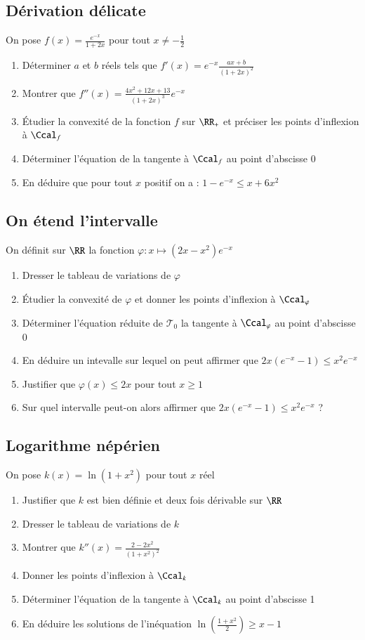 \documentclass[oneside,12pt]{article}          %
\begin{document}
\subsection{Dérivation délicate}
On pose $f(x)=\frac{e^{-x}}{1+2x}$ pour tout $x\neq-\frac{1}{2}$
\begin{enumerate}
    \item Déterminer $a$ et $b$ réels tels que $f'(x)=e^{-x}\frac{ax+b}{(1+2x)^2}$
    \item Montrer que $f''(x)=\frac{4x^2+12x+13}{(1+2x)^3}e^{-x}$
    \item Étudier la convexité de la fonction $f$ sur $\RR_+$ et préciser les points d'inflexion à $\Ccal_f$
    \item Déterminer l'équation de la tangente à $\Ccal_f$ au point d'abscisse 0
    \item En déduire que pour tout $x$ positif on a : $1-e^{-x}\leq x+6x^2$
\end{enumerate}



\subsection{On étend l'intervalle}
On définit sur $\RR$ la fonction $\varphi:x\mapsto(2x-x^2)e^{-x}$
\begin{enumerate}
	\item Dresser le tableau de variations de $\varphi$
	\item Étudier la convexité de $\varphi$ et donner les points d'inflexion à $\Ccal_\varphi$
	\item Déterminer l'équation réduite de $\mathcal{T}_0$ la tangente à $\Ccal_\varphi$ au point d'abscisse 0
	\item En déduire un intevalle sur lequel on peut affirmer que $2x(e^{-x}-1)\leq x^2e^{-x}$
	\item Justifier que $\varphi(x)\leq2x$ pour tout $x\geq1$
	\item Sur quel intervalle peut-on alors affirmer que $2x(e^{-x}-1)\leq x^2e^{-x}$ ?
\end{enumerate}



\subsection{Logarithme népérien}
On pose $k(x)=\ln(1+x^2)$ pour tout $x$ réel
\begin{enumerate}
    \item Justifier que $k$ est bien définie et deux fois dérivable sur $\RR$
    \item Dresser le tableau de variations de $k$
    \item Montrer que $k''(x)=\frac{2-2x^2}{(1+x^2)^2}$
    \item Donner les points d'inflexion à $\Ccal_k$
    \item Déterminer l'équation de la tangente à $\Ccal_k$ au point d'abscisse 1
    \item En déduire les solutions de l'inéquation $\ln\left(\frac{1+x^2}{2}\right)\geq x-1$
\end{enumerate}
\end{document}
